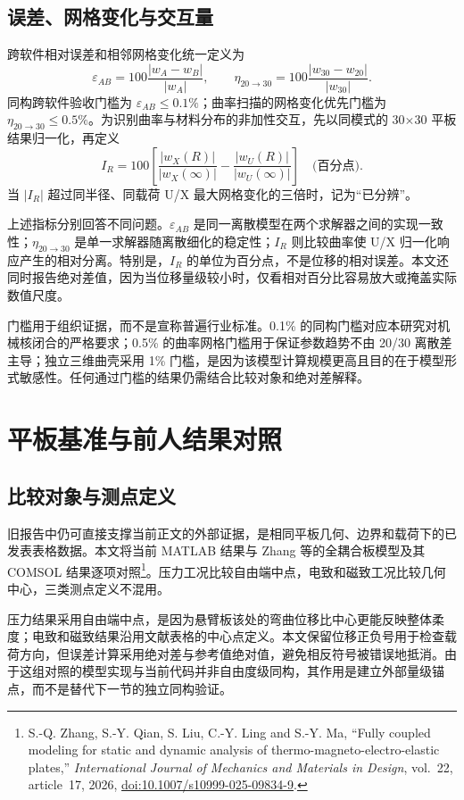 \documentclass[UTF8,fontset=windows,11pt,a4paper]{ctexart}
\begin{document}
\subsection{误差、网格变化与交互量}

跨软件相对误差和相邻网格变化统一定义为
\[
\varepsilon_{AB}=100\frac{|w_A-w_B|}{|w_A|},
\qquad
\eta_{20\rightarrow30}=100\frac{|w_{30}-w_{20}|}{|w_{30}|}.
\]
同构跨软件验收门槛为 $\varepsilon_{AB}\le0.1\%$；曲率扫描的网格变化优先门槛为 $\eta_{20\rightarrow30}\le0.5\%$。为识别曲率与材料分布的非加性交互，先以同模式的 30$\times$30 平板结果归一化，再定义
\[
I_R=100\left[
\frac{|w_X(R)|}{|w_X(\infty)|}
-\frac{|w_U(R)|}{|w_U(\infty)|}
\right]\quad\text{(百分点)}.
\]
当 $|I_R|$ 超过同半径、同载荷 U/X 最大网格变化的三倍时，记为“已分辨”。

上述指标分别回答不同问题。$\varepsilon_{AB}$ 是同一离散模型在两个求解器之间的实现一致性；$\eta_{20\rightarrow30}$ 是单一求解器随离散细化的稳定性；$I_R$ 则比较曲率使 U/X 归一化响应产生的相对分离。特别是，$I_R$ 的单位为百分点，不是位移的相对误差。本文还同时报告绝对差值，因为当位移量级较小时，仅看相对百分比容易放大或掩盖实际数值尺度。

门槛用于组织证据，而不是宣称普遍行业标准。0.1\% 的同构门槛对应本研究对机械核闭合的严格要求；0.5\% 的曲率网格门槛用于保证参数趋势不由 20/30 离散差主导；独立三维曲壳采用 1\% 门槛，是因为该模型计算规模更高且目的在于模型形式敏感性。任何通过门槛的结果仍需结合比较对象和绝对差解释。

\section{平板基准与前人结果对照}

\subsection{比较对象与测点定义}

旧报告中仍可直接支撑当前正文的外部证据，是相同平板几何、边界和载荷下的已发表表格数据。本文将当前 MATLAB 结果与 Zhang 等的全耦合板模型及其 COMSOL 结果逐项对照\footnote{S.-Q. Zhang, S.-Y. Qian, S. Liu, C.-Y. Ling and S.-Y. Ma, ``Fully coupled modeling for static and dynamic analysis of thermo-magneto-electro-elastic plates,'' \emph{International Journal of Mechanics and Materials in Design}, vol.~22, article~17, 2026, \href{https://doi.org/10.1007/s10999-025-09834-9}{doi:10.1007/s10999-025-09834-9}.}。压力工况比较自由端中点，电致和磁致工况比较几何中心，三类测点定义不混用。

压力结果采用自由端中点，是因为悬臂板该处的弯曲位移比中心更能反映整体柔度；电致和磁致结果沿用文献表格的中心点定义。本文保留位移正负号用于检查载荷方向，但误差计算采用绝对差与参考值绝对值，避免相反符号被错误地抵消。由于这组对照的模型实现与当前代码并非自由度级同构，其作用是建立外部量级锚点，而不是替代下一节的独立同构验证。
\end{document}
